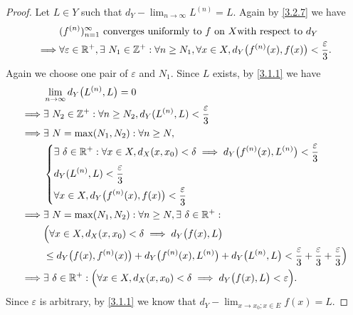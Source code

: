 \begin{proof}
  Let \(L \in Y\) such that \(d_Y - \lim_{n \to \infty} L^{(n)} = L\).
  Again by \cref{3.2.7} we have
  \begin{align*}
             & (f^{(n)})_{n = 1}^\infty \text{ converges uniformly to } f \text{ on } X \text{with respect to } d_Y                                               \\
    \implies & \forall \varepsilon \in \mathbb{R}^+, \exists\ N_1 \in \mathbb{Z}^+ : \forall n \geq N_1, \forall x \in X, d_Y\big(f^{(n)}(x), f(x)\big) < \dfrac{\varepsilon}{3}.
  \end{align*}
  Again we choose one pair of \(\varepsilon\) and \(N_1\).
  Since \(L\) exists, by \cref{3.1.1} we have
  \begin{align*}
             & \lim_{n \to \infty} d_Y\big(L^{(n)}, L\big) = 0                                                                                                                                 \\
    \implies & \exists\ N_2 \in \mathbb{Z}^+ : \forall n \geq N_2, d_Y(L^{(n)}, L) < \dfrac{\varepsilon}{3}                                                                                            \\
    \implies & \exists\ N = \max(N_1, N_2) : \forall n \geq N,                                                                                                                                 \\
             & \begin{dcases}
                 \exists\ \delta \in \mathbb{R}^+ : \forall x \in X, d_X(x, x_0) < \delta \implies d_Y\big(f^{(n)}(x), L^{(n)}\big) < \dfrac{\varepsilon}{3} \\
                 d_Y(L^{(n)}, L) < \dfrac{\varepsilon}{3}                                                                                            \\
                 \forall x \in X, d_Y\big(f^{(n)}(x), f(x)\big) < \dfrac{\varepsilon}{3}
               \end{dcases}                                             \\
    \implies & \exists\ N = \max(N_1, N_2) : \forall n \geq N, \exists\ \delta \in \mathbb{R}^+ :                                                                                                      \\
             & \Big(\forall x \in X, d_X(x, x_0) < \delta \implies d_Y\big(f(x), L\big)                                                                                                        \\
             & \leq d_Y\big(f(x), f^{(n)}(x)\big) + d_Y\big(f^{(n)}(x), L^{(n)}\big) + d_Y\big(L^{(n)}, L\big) < \dfrac{\varepsilon}{3} + \dfrac{\varepsilon}{3} + \dfrac{\varepsilon}{3}\Big) \\
    \implies & \exists\ \delta \in \mathbb{R}^+ : \Big(\forall x \in X, d_X(x, x_0) < \delta \implies d_Y\big(f(x), L\big) < \varepsilon\Big).
  \end{align*}
  Since \(\varepsilon\) is arbitrary, by \cref{3.1.1} we know that \(d_Y - \lim_{x \to x_0 ; x \in E} f(x) = L\).
\end{proof}


